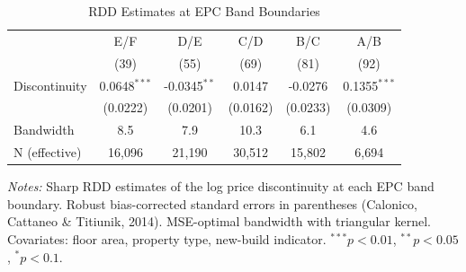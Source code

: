 \begin{table}[htbp]
\centering
\caption{RDD Estimates at EPC Band Boundaries}
\label{tab:main_rdd}
\begin{tabular}{lccccc}
\toprule
 & E/F & D/E & C/D & B/C & A/B \\
 & (39) & (55) & (69) & (81) & (92) \\
\midrule
Discontinuity & 0.0648$^{***}$ & -0.0345$^{**}$ & 0.0147 & -0.0276 & 0.1355$^{***}$ \\
 & (0.0222) & (0.0201) & (0.0162) & (0.0233) & (0.0309) \\
\midrule
Bandwidth & 8.5 & 7.9 & 10.3 & 6.1 & 4.6 \\
N (effective) & 16,096 & 21,190 & 30,512 & 15,802 & 6,694 \\
\bottomrule
\end{tabular}
\begin{minipage}{\textwidth}
\footnotesize
\textit{Notes:} Sharp RDD estimates of the log price discontinuity at each EPC band boundary.
Robust bias-corrected standard errors in parentheses (Calonico, Cattaneo \& Titiunik, 2014).
MSE-optimal bandwidth with triangular kernel. Covariates: floor area, property type, new-build indicator.
$^{***}p<0.01$, $^{**}p<0.05$, $^{*}p<0.1$.
\end{minipage}
\end{table}
